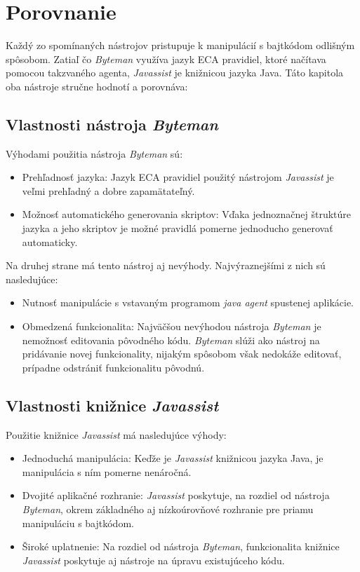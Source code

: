 \documentclass[11pt,final,oneside]{fithesis}
\begin{document}
\chapter{Porovnanie}

Každý zo spomínaných nástrojov pristupuje k manipulácií s bajtkódom odlišným 
spôsobom. Zatiaľ čo \textit{Byteman} využíva jazyk ECA pravidiel, ktoré 
načítava pomocou takzvaného agenta, \textit{Javassist} je knižnicou jazyka 
Java. Táto kapitola oba nástroje stručne hodnotí a porovnáva:

\section{Vlastnosti nástroja \textit{Byteman}}
Výhodami použitia nástroja \textit{Byteman} sú:

\begin{itemize}
\item Prehľadnosť jazyka: Jazyk ECA pravidiel použitý nástrojom 
\textit{Javassist} je veľmi prehľadný a dobre zapamätateľný. 
\item Možnosť automatického generovania skriptov: Vďaka jednoznačnej štruktúre 
jazyka a jeho skriptov je možné pravidlá pomerne jednoducho generovať 
automaticky.
\end{itemize}

Na druhej strane má tento nástroj aj nevýhody. Najvýraznejšími z nich sú nasledujúce:

\begin{itemize}
\item Nutnosť manipulácie s vstavaným programom \textit{java agent} spustenej
aplikácie.
\item Obmedzená funkcionalita: Najväčšou nevýhodou nástroja 
\textit{Byteman} je nemožnosť editovania pôvodného kódu. \textit{Byteman} slúži
ako nástroj na pridávanie novej funkcionality, nijakým spôsobom však nedokáže 
editovať, prípadne odstrániť funkcionalitu pôvodnú. 
\end{itemize}

\section{Vlastnosti knižnice \textit{Javassist}}
Použitie knižnice \textit{Javassist} má nasledujúce 
výhody:

\begin{itemize}
\item Jednoduchá manipulácia: Keďže je \textit{Javassist} knižnicou jazyka 
Java, je manipulácia s ním pomerne nenáročná.
\item Dvojité aplikačné rozhranie: \textit{Javassist} poskytuje, na rozdiel od 
nástroja \textit{Byteman}, okrem základného aj nízkoúrovňové rozhranie pre 
priamu manipuláciu s bajtkódom.
\item Široké uplatnenie: Na rozdiel od nástroja \textit{Byteman}, funkcionalita
knižnice \textit{Javassist} poskytuje aj nástroje na úpravu existujúceho kódu.
\end{itemize}
\end{document}
